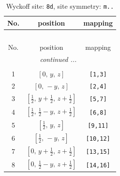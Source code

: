 \documentclass[fleqn,8pt]{jsarticle}
\begin{document}
\begin{longtable}{ccc}
\caption{Wyckoff site: {\tt 8d}, site symmetry: {\tt m..}}
 \\
 \hline \hline
No. & position & mapping \\ \hline \endfirsthead

\multicolumn{2}{l}{\tablename\ \thetable{}} \\
 \hline \hline
No. & position & mapping \\ \hline \endhead

 \hline \hline
\multicolumn{2}{r}{\footnotesize\it continued ...} \\ \endfoot

 \hline \hline
\multicolumn{2}{r}{} \\ \endlastfoot

1 & $\left[ 0,\, y,\, z \right]$ & {\tt [1,3]} \\ \hline
2 & $\left[ 0,\, - y,\, z \right]$ & {\tt [2,4]} \\ \hline
3 & $\left[ \frac{1}{2},\, y + \frac{1}{2},\, z + \frac{1}{2} \right]$ & {\tt [5,7]} \\ \hline
4 & $\left[ \frac{1}{2},\, \frac{1}{2} - y,\, z + \frac{1}{2} \right]$ & {\tt [6,8]} \\ \hline
5 & $\left[ \frac{1}{2},\, y,\, z \right]$ & {\tt [9,11]} \\ \hline
6 & $\left[ \frac{1}{2},\, - y,\, z \right]$ & {\tt [10,12]} \\ \hline
7 & $\left[ 0,\, y + \frac{1}{2},\, z + \frac{1}{2} \right]$ & {\tt [13,15]} \\ \hline
8 & $\left[ 0,\, \frac{1}{2} - y,\, z + \frac{1}{2} \right]$ & {\tt [14,16]} \\
\end{longtable}
\renewcommand{\arraystretch}{1.2}
\end{document}
